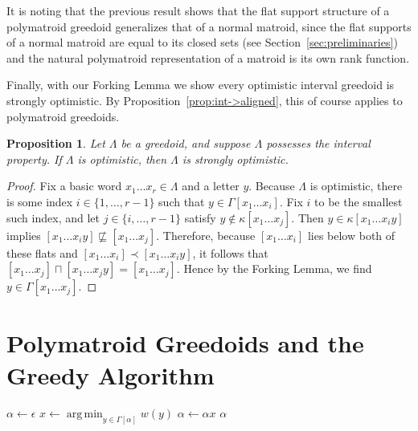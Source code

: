 \documentclass[11pt]{article}
\newtheorem{proposition}[theorem]{Proposition}
\newcommand{\glang}{\Lambda}
\DeclareMathOperator*{\argmin}{arg\,min}
\begin{document}
It is noting that the previous result shows that the flat support structure of a polymatroid greedoid generalizes that of a normal matroid, since the flat supports of a normal matroid are equal to its closed sets (see Section~\ref{sec:preliminaries}) and the natural polymatroid representation of a matroid is its own rank function.


Finally, with our Forking Lemma we show every optimistic interval greedoid is strongly optimistic.
By Proposition~\ref{prop:int->aligned}, this of course applies to polymatroid greedoids.

\begin{proposition}\label{prop:int->strong-opt}
    Let $\glang$ be a greedoid, and suppose $\glang$ possesses the interval property.
    If $\glang$ is optimistic, then $\glang$ is strongly optimistic.
\end{proposition}
\begin{proof}
    Fix a basic word $x_1\ldots x_r\in\glang$ and a letter $y$.
    Because $\glang$ is optimistic, there is some index $i\in\{1,\ldots, r-1\}$ such that $y\in\Gamma[x_1\ldots x_i]$.
    Fix $i$ to be the smallest such index, and let $j \in \{i,\ldots, r-1\}$ satisfy $y \notin\kappa[x_1\ldots x_j]$.
    Then $y \in\kappa[x_1\ldots x_i y]$ implies $[x_1\ldots x_i y] \not\sqsubseteq[x_1\ldots x_j]$.
    Therefore, because $[x_1\ldots x_i]$ lies below both of these flats and $[x_1\ldots x_i] \prec [x_1\ldots x_i y]$, it follows that $[x_1\ldots x_j] \sqcap [x_1\ldots x_j y] = [x_1\ldots x_j]$.
    Hence by the Forking Lemma, we find $y\in\Gamma[x_1\ldots x_j]$.
\end{proof}
\fi

\section{Polymatroid Greedoids and the Greedy Algorithm}\label{sec:characterization}
\begin{algorithm*}[t]
    \DontPrintSemicolon
    \small
    $\alpha\gets\epsilon$\;
    \While{$\Gamma[\alpha]\neq\varnothing$}
    {
        $x \gets \argmin_{y\in\Gamma[\alpha]}w(y)$\;
        $\alpha\gets\alpha x$\;
    }
    \;
    \Return $\alpha$
    \caption{The Greedy Algorithm}\label{alg:greedy}
\end{algorithm*}
\end{document}

